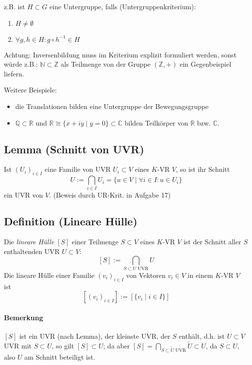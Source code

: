        z.B. ist $H\subset G$ eine Untergruppe, falls (Untergruppenkriterium):
        \begin{enumerate}
            \item $H\neq \emptyset$
            \item $\forall g,h\in H: g\circ h^{-1} \in H$
        \end{enumerate}
        
	Achtung: Inversenbildung muss im Kriterium explizit formuliert werden, sonst würde z.B.: $\mathbb{N}\subset\mathbb{Z}$ als Teilmenge von der Gruppe $(\mathbb{Z}, +)$ ein Gegenbeispiel liefern.
        
        Weitere Beispiele:
        \begin{itemize}
            \item die Translationen bilden eine Untergruppe der Bewegungsgruppe
            \item $\mathbb{Q}\subset\mathbb{R}$ und $\mathbb{R}\cong \{x+iy\mid y=0\}\subset\mathbb{C}$ bilden Teilkörper von $\mathbb{R}$ bzw. $\mathbb{C}$.
        \end{itemize}

\subsection{Lemma (Schnitt von UVR)}
    \begin{Lemma}
    	Ist $(U_i)_{i\in I}$ eine Familie von UVR $U_i\subset V$ eines $K$-VR $V$, so ist ihr Schnitt
        \[ U:= \bigcap_{i\in I}U_i =\{ u\in V\mid \forall i\in I: u\in U_i\} \]
	ein UVR von $V$. (Beweis durch UR-Krit. in Aufgabe 17)
    \end{Lemma}
    
\subsection{Definition (Lineare Hülle)}
	\begin{Definition}
		Die \emph{lineare Hülle} $[S]$ einer Teilmenge $S\subset V$ eines $ K $-VR $ V $ ist der Schnitt aller $S$ enthaltenden UVR $U\subset V$:
		\[ [S] := \bigcap_{S\subset U \text{ UVR}} U \]
	Die lineare Hülle einer Familie $(v_i)_{i\in I}$ von Vektoren $v_i\in V$ in einem $ K $-VR $ V $ ist
		\[ [(v_i)_{i\in I}] := [\{v_i\mid i\in I\}] \]
	\end{Definition}

\paragraph{Bemerkung}
    $[S]$ ist ein UVR (nach Lemma), der \glqq kleinste\grqq{} UVR, der $S$ enthält, d.h. ist $U\subset V$ UVR mit $S\subset U$, so gilt $[S]\subset U$; da aber $[S] = \bigcap_{S\subset \tilde{U}  \text{ UVR}}\tilde{U}\subset U$,
    da $S\subset U$, also $U$ am Schnitt beteiligt ist.

